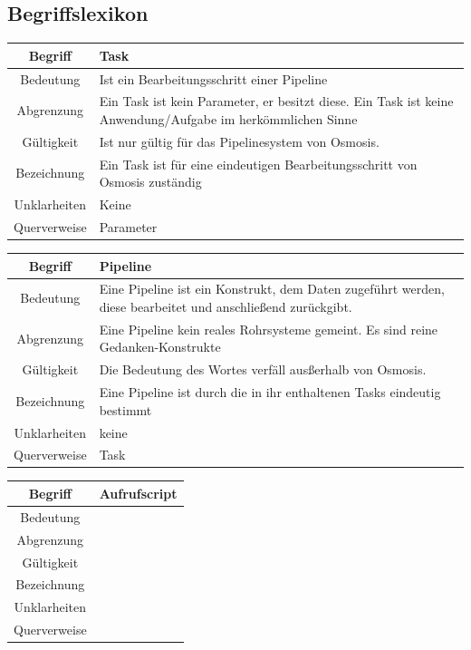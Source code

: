 \documentclass[a4paper,10pt]{scrartcl}
\begin{document}
\subsection{Begriffslexikon}
\begin{tabular}{|c|p{10cm}|}
\hline Begriff & \textbf{Task} \\ 
\hline Bedeutung & Ist ein Bearbeitungsschritt einer Pipeline\\ 
\hline Abgrenzung & Ein Task ist kein Parameter, er besitzt diese. Ein Task ist keine Anwendung/Aufgabe im herkömmlichen Sinne \\ 
\hline Gültigkeit & Ist nur gültig für das Pipelinesystem von Osmosis. \\ 
\hline Bezeichnung & Ein Task ist für eine eindeutigen Bearbeitungsschritt von Osmosis zuständig\\ 
\hline Unklarheiten & Keine \\ 
\hline Querverweise & Parameter\\ 
\hline 
\end{tabular}

\begin{tabular}{|c|p{10cm}|}
\hline Begriff & \textbf{Pipeline} \\ 
\hline Bedeutung & Eine Pipeline ist ein Konstrukt, dem Daten zugeführt werden, diese bearbeitet und anschließend zurückgibt.  \\ 
\hline Abgrenzung & Eine Pipeline kein reales Rohrsysteme gemeint. Es sind reine Gedanken-Konstrukte \\ 
\hline Gültigkeit & Die Bedeutung des Wortes verfäll ausßerhalb von Osmosis. \\ 
\hline Bezeichnung & Eine Pipeline ist durch die in ihr enthaltenen Tasks eindeutig bestimmt \\ 
\hline Unklarheiten & keine \\ 
\hline Querverweise & Task \\ 
\hline 
\end{tabular}

\begin{tabular}{|c|p{10cm}|}
\hline Begriff & \textbf{Aufrufscript} \\ 
\hline Bedeutung &  \\ 
\hline Abgrenzung &  \\ 
\hline Gültigkeit &  \\ 
\hline Bezeichnung &  \\ 
\hline Unklarheiten &  \\ 
\hline Querverweise &  \\ 
\hline 
\end{tabular}
\end{document}
